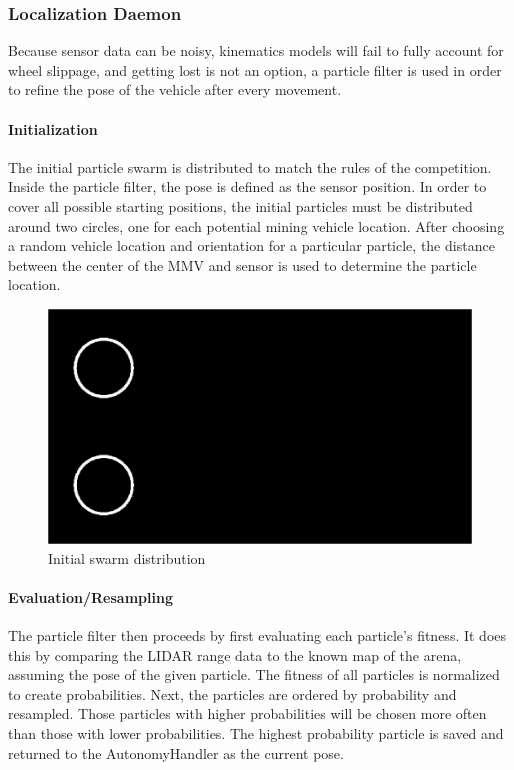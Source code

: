 \subsubsection{Localization Daemon}
Because sensor data can be noisy, kinematics models will fail to fully account for wheel slippage, and getting lost is not an option, a particle filter is used in order to refine the pose of the vehicle after every movement.
\paragraph{Initialization}
The initial particle swarm is distributed to match the rules of the competition.  Inside the particle filter, the pose is defined as the sensor position.  In order to cover all possible starting positions, the initial particles must be distributed around two circles, one for each potential mining vehicle location.  After choosing a random vehicle location and orientation for a particular particle, the distance between the center of the MMV and sensor is used to determine the particle location.
\begin{figure}[H]
\includegraphics[width=\linewidth]{swarm-init.png}
\caption{Initial swarm distribution}
\end{figure}
\paragraph{Evaluation/Resampling}
The particle filter then proceeds by first evaluating each particle's fitness.  It does this by comparing the LIDAR range data to the known map of the arena, assuming the pose of the given particle.  The fitness of all particles is normalized to create probabilities.  Next, the particles are ordered by probability and resampled.  Those particles with higher probabilities will be chosen more often than those with lower probabilities.  The highest probability particle is saved and returned to the AutonomyHandler as the current pose.
